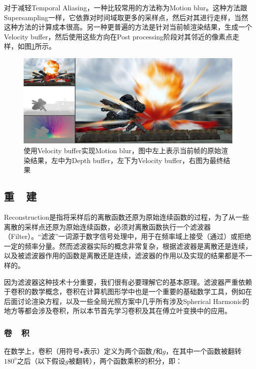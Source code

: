 对于减轻Temporal Aliasing，一种比较常用的方法称为Motion blur。这种方法跟Supersampling一样，它依靠对时间域取更多的采样点，然后对其进行走样，当然这种方法的计算成本很高。另一种更普遍的方法是针对当前帧渲染结果，生成一个Velocity buffer\cite{a:AReconstructionFilterforPlausibleMotionBlur}，然后使用这些方向在Post processing阶段对其邻近的像素点走样，如图\ref{f:intro-motion-blur}所示。

\begin{figure}
	\includegraphics[width=1.\textwidth]{figures/intro/motion-blur}
	\caption{使用Velocity buffer实现Motion blur，图中左上表示当前帧的原始渲染结果，左中为Depth buffer，左下为Velocity buffer，右图为最终结果}
	\label{f:intro-motion-blur}
\end{figure}





\subsection{重~~建}\label{sec:intro-reconstruction}
Reconstruction是指将采样后的离散函数还原为原始连续函数的过程，为了从一些离散的采样点还原为原始连续函数，必须对离散函数执行一个滤波器（Filter）。“滤波”一词源于数字信号处理中，用于在频率域上接受（通过）或拒绝一定的频率分量。然而滤波器实际的概念非常复杂，根据滤波器是离散还是连续，以及被滤波器作用的函数是离散还是连续，滤波器的作用以及实现的结果都是不一样的。

因为滤波器这种技术十分重要，我们很有必要理解它的基本原理。滤波器严重依赖于卷积的数学概念，卷积在计算机图形学中也是一个重要的基础数学工具，例如在后面讨论渲染方程，以及一些全局光照方案中几乎所有涉及Spherical Harmonic的地方等都会涉及卷积，所以本节首先学习卷积及其在傅立叶变换中的应用。



\subsubsection{卷~~积}
在数学上，卷积（用符号$\star$表示）定义为两个函数$f$和$g$，在其中一个函数被翻转$180^{o}$之后（以下假设$g$被翻转），两个函数乘积的积分，即：

